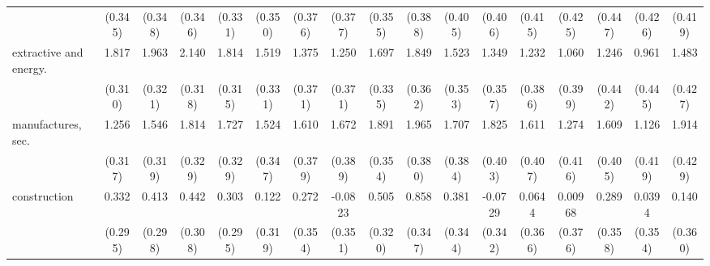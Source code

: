 {\begin{tabular}{l*{16}{c}}
                    &     (0.345)         &     (0.348)         &     (0.346)         &     (0.331)         &     (0.350)         &     (0.376)         &     (0.377)         &     (0.355)         &     (0.388)         &     (0.405)         &     (0.406)         &     (0.415)         &     (0.425)         &     (0.447)         &     (0.426)         &     (0.419)         \\
[1em]
extractive and energy.&       1.817\sym{***}&       1.963\sym{***}&       2.140\sym{***}&       1.814\sym{***}&       1.519\sym{***}&       1.375\sym{***}&       1.250\sym{***}&       1.697\sym{***}&       1.849\sym{***}&       1.523\sym{***}&       1.349\sym{***}&       1.232\sym{**} &       1.060\sym{**} &       1.246\sym{**} &       0.961\sym{*}  &       1.483\sym{***}\\
                    &     (0.310)         &     (0.321)         &     (0.318)         &     (0.315)         &     (0.331)         &     (0.371)         &     (0.371)         &     (0.335)         &     (0.362)         &     (0.353)         &     (0.357)         &     (0.386)         &     (0.399)         &     (0.442)         &     (0.445)         &     (0.427)         \\
[1em]
manufactures, sec.  &       1.256\sym{***}&       1.546\sym{***}&       1.814\sym{***}&       1.727\sym{***}&       1.524\sym{***}&       1.610\sym{***}&       1.672\sym{***}&       1.891\sym{***}&       1.965\sym{***}&       1.707\sym{***}&       1.825\sym{***}&       1.611\sym{***}&       1.274\sym{**} &       1.609\sym{***}&       1.126\sym{**} &       1.914\sym{***}\\
                    &     (0.317)         &     (0.319)         &     (0.329)         &     (0.329)         &     (0.347)         &     (0.379)         &     (0.389)         &     (0.354)         &     (0.380)         &     (0.384)         &     (0.403)         &     (0.407)         &     (0.416)         &     (0.405)         &     (0.419)         &     (0.429)         \\
[1em]
construction        &       0.332         &       0.413         &       0.442         &       0.303         &       0.122         &       0.272         &     -0.0823         &       0.505         &       0.858\sym{*}  &       0.381         &     -0.0729         &      0.0644         &     0.00968         &       0.289         &      0.0394         &       0.140         \\
                    &     (0.295)         &     (0.298)         &     (0.308)         &     (0.295)         &     (0.319)         &     (0.354)         &     (0.351)         &     (0.320)         &     (0.347)         &     (0.344)         &     (0.342)         &     (0.366)         &     (0.376)         &     (0.358)         &     (0.354)         &     (0.360)         \\

\end{tabular}}
